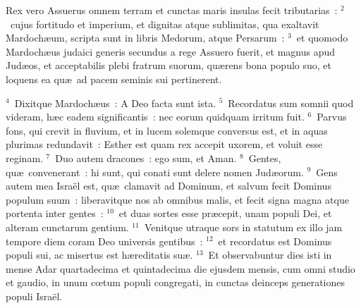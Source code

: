 \lettrine[lines=10,image=true,loversize=0.05,lraise=-0.03]{R}{}ex vero Assuerus omnem terram et cunctas maris insulas fecit tributarias~:
${}^{2}$~cujus fortitudo et imperium, et dignitas atque sublimitas, qua exaltavit Mardoch\ae um, scripta sunt in libris Medorum, atque Persarum~:
${}^{3}$~et quomodo Mardoch\ae us judaici generis secundus a rege Assuero fuerit, et magnus apud Jud\ae os, et acceptabilis plebi fratrum suorum, qu\ae rens bona populo suo, et loquens ea qu\ae\ ad pacem seminis sui pertinerent.


${}^{4}$~Dixitque Mardoch\ae us~: A Deo facta sunt ista.
${}^{5}$~Recordatus sum somnii quod videram, h\ae c eadem significantis~: nec eorum quidquam irritum fuit.
${}^{6}$~Parvus fons, qui crevit in fluvium, et in lucem solemque conversus est, et in aquas plurimas redundavit~: Esther est quam rex accepit uxorem, et voluit esse reginam.
${}^{7}$~Duo autem dracones~: ego sum, et Aman.
${}^{8}$~Gentes, qu\ae\ convenerant~: hi sunt, qui conati sunt delere nomen Jud\ae orum.
${}^{9}$~Gens autem mea Isra\"el est, qu\ae\ clamavit ad Dominum, et salvum fecit Dominus populum suum~: liberavitque nos ab omnibus malis, et fecit signa magna atque portenta inter gentes~:
${}^{10}$~et duas sortes esse pr\ae cepit, unam populi Dei, et alteram cunctarum gentium.
${}^{11}$~Venitque utraque sors in statutum ex illo jam tempore diem coram Deo universis gentibus~:
${}^{12}$~et recordatus est Dominus populi sui, ac misertus est h\ae reditatis su\ae .
${}^{13}$~Et observabuntur dies isti in mense Adar quartadecima et quintadecima die ejusdem mensis, cum omni studio et gaudio, in unum cœtum populi congregati, in cunctas deinceps generationes populi Isra\"el.

